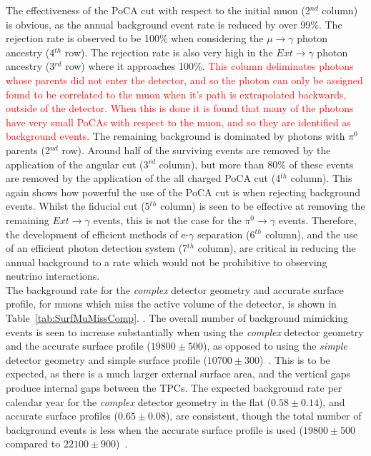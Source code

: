 The effectiveness of the PoCA cut with respect to the initial muon (2$^{nd}$ column) is obvious, as the annual background event rate is reduced by over 99\%. The rejection rate is observed to be 100\% when considering the $\mu\to\gamma$ photon ancestry (4$^{th}$ row). The rejection rate is also very high in the $Ext\to\gamma$ photon ancestry (3$^{rd}$ row) where it approaches 100\%. \textcolor{red}{This column deliminates photons whose parents did not enter the detector, and so the photon can only be assigned found to be correlated to the muon when it's path is extrapolated backwards, outside of the detector. When this is done it is found that many of the photons have very small PoCAs with respect to the muon, and so they are identified as background events.} The remaining background is dominated by photons with $\pi^{0}$ parents (2$^{nd}$ row). Around half of the surviving events are removed by the application of the angular cut (3$^{rd}$ column), but more than 80\% of these events are removed by the application of the all charged PoCA cut (4$^{th}$ column). This again shows how powerful the use of the PoCA cut is when rejecting background events. Whilst the fiducial cut (5$^{th}$ column) is seen to be effective at removing the remaining $Ext\to\gamma$ events, this is not the case for the $\pi^0\to\gamma$ events. Therefore, the development of efficient methods of e-$\gamma$ separation (6$^{th}$ column), and the use of an efficient photon detection system (7$^{th}$ column), are critical in reducing the annual background to a rate which would not be prohibitive to observing neutrino interactions. \\

The background rate for the \emph{complex} detector geometry and accurate surface profile, for muons which miss the active volume of the detector, is shown in Table~\ref{tab:SurfMuMissComp}. . The overall number of background mimicking events is seen to increase substantially  when using the \emph{complex} detector geometry and the accurate surface profile ($19800\pm500$), as opposed to using the \emph{simple} detector geometry and simple surface profile ($10700\pm300$)~\citep{MartinsThesis}. This is to be expected, as there is a much larger external surface area, and the vertical gaps produce internal gaps between the TPCs. The expected background rate per calendar year for the \emph{complex} detector geometry in the flat ($0.58\pm0.14$), and accurate surface profiles ($0.65\pm0.08$), are consistent, though the total number of background events is less when the accurate surface profile is used ($19800\pm500$ compared to $22100\pm900$)~\citep{MartinsThesis}. \\

